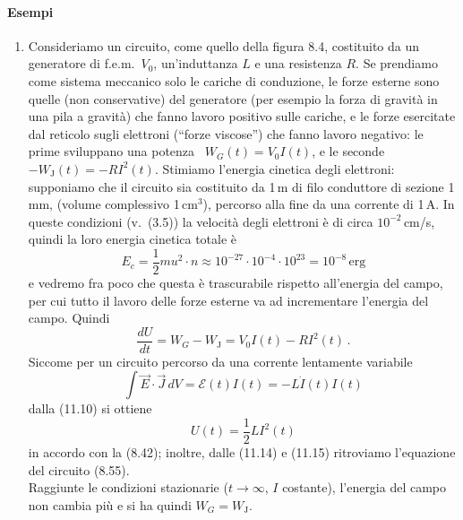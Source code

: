 \paragraph{Esempi}
\begin{enumerate}
  \item Consideriamo un circuito, come quello della figura 8.4, costituito da un
    generatore di f.e.m.\ $V_0$, un'induttanza $L$ e una resistenza $R$. Se
    prendiamo come sistema meccanico solo le cariche di conduzione, le forze
    esterne sono quelle (non conservative) del generatore (per esempio la forza
    di gravit\`a in una pila a gravit\`a) che fanno lavoro positivo sulle
    cariche, e le forze esercitate dal reticolo sugli elettroni (``forze
    viscose'') che fanno lavoro negativo: le prime sviluppano una potenza
    \ $W_G(t)=V_0I(t)$, e le seconde \ $-W_\mathrm{J}(t)=-RI^2(t)$. Stimiamo
    l'energia cinetica degli elettroni: supponiamo che il circuito sia
    costituito da 1\,m di filo conduttore di sezione 1\,mm, (volume complessivo
    1\,cm$^3$), percorso alla fine da una corrente di 1\,A. In queste condizioni
    \big(v.\ (3.5)\big) la velocit\`a degli elettroni \`e di circa
    $10^{-2}$\,cm/s, quindi la loro energia cinetica totale \`e
    \begin{equation}
      E_c=\frac{1}{2}mu^2\cdot n
      \approx10^{-27}\cdot10^{-4}\cdot10^{23}=10^{-8}\,\mathrm{erg}
      \tag{11.13}
    \end{equation}
    e vedremo fra poco che questa \`e trascurabile rispetto all'energia del
    campo, per cui tutto il lavoro delle forze esterne va ad incrementare
    l'energia del campo. Quindi
    \begin{equation}
      \frac{dU}{dt}=W_G-W_\mathrm{J}=V_0I(t)-RI^2(t)\,.
      \tag{11.14}
    \end{equation}
    Siccome per un circuito percorso da una corrente lentamente variabile
    \begin{equation}
      \int\vec E\cdot\vec J\,dV=\mathcal E(t)I(t)=-L\dot I(t)I(t)
      \tag{11.15}
    \end{equation}
    dalla (11.10) si ottiene
    \begin{equation}
      U(t)=\frac{1}{2}LI^2(t)
      \tag{11.16}
    \end{equation}
    in accordo con la (8.42); inoltre, dalle (11.14) e (11.15) ritroviamo
    l'equazione del circuito (8.55).\\
    Raggiunte le condizioni stazionarie ($t\to\infty$, $I$ costante), l'energia
    del campo non cambia pi\`u e si ha quindi $W_G=W_\mathrm{J}$.\\

\end{enumerate}
